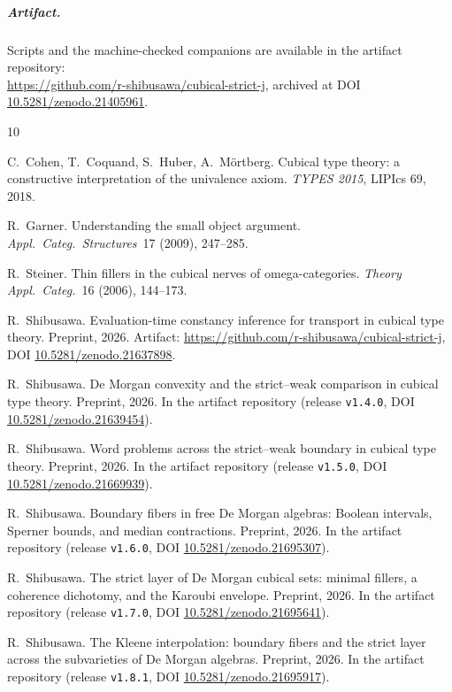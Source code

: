 \documentclass[11pt]{amsart}
\theoremstyle{definition}
\begin{document}
\subparagraph*{Artifact.}  Scripts and the machine-checked
companions are available in the artifact repository:\\
\url{https://github.com/r-shibusawa/cubical-strict-j}, archived
at DOI \href{https://doi.org/10.5281/zenodo.21405961}%
{10.5281/zenodo.21405961}.

\begin{thebibliography}{10}

C.~Cohen, T.~Coquand, S.~Huber, A.~M\"ortberg.
\newblock Cubical type theory: a constructive interpretation of the
  univalence axiom.
\newblock \emph{TYPES 2015}, LIPIcs 69, 2018.

R.~Garner.
\newblock Understanding the small object argument.
\newblock \emph{Appl.\ Categ.\ Structures}\ 17 (2009), 247--285.

R.~Steiner.
\newblock Thin fillers in the cubical nerves of omega-categories.
\newblock \emph{Theory Appl.\ Categ.}\ 16 (2006), 144--173.

R.~Shibusawa.
\newblock Evaluation-time constancy inference for transport in
  cubical type theory.
\newblock Preprint, 2026.  Artifact:
  \url{https://github.com/r-shibusawa/cubical-strict-j}, DOI
  \href{https://doi.org/10.5281/zenodo.21637898}%
  {10.5281/zenodo.21637898}.

R.~Shibusawa.
\newblock De Morgan convexity and the strict--weak comparison in
  cubical type theory.
\newblock Preprint, 2026.  In the artifact repository (release
  \texttt{v1.4.0}, DOI
  \href{https://doi.org/10.5281/zenodo.21639454}%
  {10.5281/zenodo.21639454}).

R.~Shibusawa.
\newblock Word problems across the strict--weak boundary in cubical
  type theory.
\newblock Preprint, 2026.  In the artifact repository (release
  \texttt{v1.5.0}, DOI
  \href{https://doi.org/10.5281/zenodo.21669939}%
  {10.5281/zenodo.21669939}).

R.~Shibusawa.
\newblock Boundary fibers in free De Morgan algebras: Boolean
  intervals, Sperner bounds, and median contractions.
\newblock Preprint, 2026.  In the artifact repository (release
  \texttt{v1.6.0}, DOI
  \href{https://doi.org/10.5281/zenodo.21695307}%
  {10.5281/zenodo.21695307}).

R.~Shibusawa.
\newblock The strict layer of De Morgan cubical sets: minimal
  fillers, a coherence dichotomy, and the Karoubi envelope.
\newblock Preprint, 2026.  In the artifact repository (release
  \texttt{v1.7.0}, DOI
  \href{https://doi.org/10.5281/zenodo.21695641}%
  {10.5281/zenodo.21695641}).

R.~Shibusawa.
\newblock The Kleene interpolation: boundary fibers and the strict
  layer across the subvarieties of De Morgan algebras.
\newblock Preprint, 2026.  In the artifact repository (release
  \texttt{v1.8.1}, DOI
  \href{https://doi.org/10.5281/zenodo.21695917}%
  {10.5281/zenodo.21695917}).

\end{thebibliography}
\end{document}
